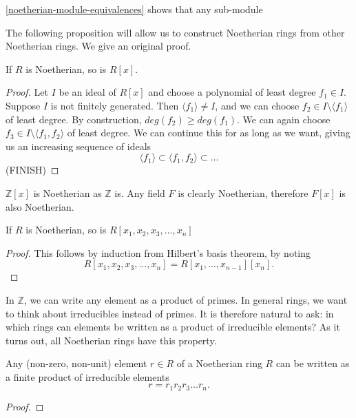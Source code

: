\begin{remark}
\cref{noetherian-module-equivalences} shows that any sub-module 
\end{remark}
The following proposition will allow us to construct Noetherian rings from other Noetherian rings. We give an original proof.
\begin{proposition}
If $R$ is Noetherian, so is $R[x]$.
\end{proposition}
\begin{proof}
Let $I$ be an ideal of $R[x]$ and choose a polynomial of least degree $f_1\in I$. Suppose $I$ is not finitely generated. Then $\langle f_1 \rangle \neq I$, and we can choose $f_2\in I\setminus \langle f_1\rangle$ of least degree. By construction, $deg(f_2)\geq deg(f_1)$. We can again choose $f_3\in I\setminus \langle f_1,f_2\rangle$ of least degree. We can continue this for as long as we want, giving us an increasing sequence of ideals
$$\langle f_1\rangle\subset \langle f_1,f_2\rangle\subset \dots$$ (FINISH)
\end{proof}

\begin{example}
$\mathbb{Z}[x]$ is Noetherian as $\mathbb{Z}$ is. Any field $F$ is clearly Noetherian, therefore $F[x]$ is also Noetherian.
\end{example}

\begin{remark}

\end{remark}

\begin{corollary}
If $R$ is Noetherian, so is $R[x_1,x_2,x_3,\dots,x_n]$
\end{corollary}
\begin{proof}
This follows by induction from Hilbert's basis theorem, by noting $$R[x_1,x_2,x_3,\dots,x_n]=R[x_1,\dots,x_{n-1}][x_n].$$
\end{proof}

In $\mathbb{Z}$, we can write any element as a product of primes. In general rings, we want to think about irreducibles instead of primes. It is therefore natural to ask: in which rings can elements be written as a product of irreducible elements? As it turns out, all Noetherian rings have this property.

\begin{lemma}\label{noetherian-irreducible-elements}
Any (non-zero, non-unit) element $r\in R$ of a Noetherian ring $R$ can be written as a finite product of irreducible elements
$$r=r_1r_2r_3\dots r_n.$$
\end{lemma}
\begin{proof}

\end{proof}

